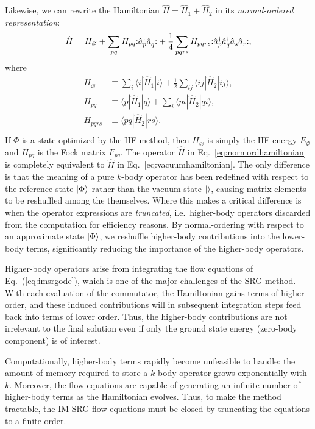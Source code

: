 Likewise, we can rewrite the Hamiltonian $\hat H = \hat{H}_1 + \hat{H}_2$ in its \emph{normal-ordered representation}:
\begin{align}
  \hat{H} = H_\varnothing + \sum_{p q} H_{p q} \mathopen: \hat{a}_p^\dagger \hat{a}_q^{} \mathclose: + \frac{1}{4} \sum_{p q r s} H_{p q r s} \mathopen: \hat{a}_p^\dagger \hat{a}_q^\dagger \hat{a}_s^{} \hat{a}_r^{} \mathclose:,
  \label{eq:normordhamiltonian}
\end{align}
where
\begin{align*}
  H_\varnothing &\equiv \sum_i \langle i | \hat{H}_1 | i \rangle + \frac{1}{2} \sum_{i j} \langle i j | \hat{H}_2 | i j \rangle, \\
  H_{p q} &\equiv \langle p | \hat{H}_1 | q \rangle + \sum_i \langle p i | \hat{H}_2 | q i \rangle, \\
  H_{p q r s} &\equiv \langle p q | \hat{H}_2 | r s \rangle. \\
\end{align*}
If $\Phi$ is a state optimized by the HF method, then $H_\varnothing$ is simply the HF energy $E_\Phi$ and $H_{p q}$ is the Fock matrix $F_{p q}$.  The operator $\hat H$ in Eq.\ \eqref{eq:normordhamiltonian} is completely equivalent to $\hat H$ in Eq.\ \eqref{eq:vacuumhamiltonian}.  The only difference is that the meaning of a pure $k$-body operator has been redefined with respect to the reference state $| \Phi \rangle$ rather than the vacuum state $|  \rangle$, causing matrix elements to be reshuffled among the themselves.  Where this makes a critical difference is when the operator expressions are \emph{truncated}, i.e.\ higher-body operators discarded from the computation for efficiency reasons.  By normal-ordering with respect to an approximate state $| \Phi \rangle$, we reshuffle higher-body contributions into the lower-body terms, significantly reducing the importance of the higher-body operators.

Higher-body operators arise from integrating the flow equations of Eq.\ (\ref{eq:imsrgode}), which is one of the major challenges of the SRG method.  With each evaluation of the commutator, the Hamiltonian gains terms of higher order, and these induced contributions will in subsequent integration steps feed back into terms of lower order.  Thus, the higher-body contributions are not irrelevant to the final solution even if only the ground state energy (zero-body component) is of interest.

Computationally, higher-body terms rapidly become unfeasible to handle: the amount of memory required to store a $k$-body operator grows exponentially with $k$.  Moreover, the flow equations are capable of generating an infinite number of higher-body terms as the Hamiltonian evolves.  Thus, to make the method tractable, the IM-SRG flow equations must be closed by truncating the equations to a finite order.

